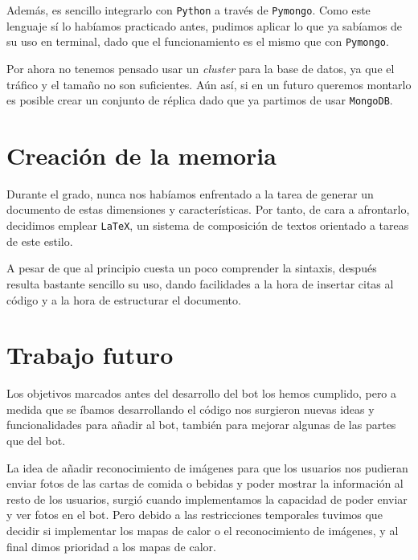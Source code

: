 \documentclass[oneside]{memoir}
\begin{document}
Además, es sencillo integrarlo con \texttt{Python} a través de \texttt{Pymongo}. Como este lenguaje sí lo habíamos practicado antes, pudimos aplicar lo que ya sabíamos de su uso en terminal, dado que el funcionamiento es el mismo que con \texttt{Pymongo}. 

Por ahora no tenemos pensado usar un \textit{cluster} para la base de datos, ya que el tráfico y el tamaño no son suficientes. Aún así, si en un futuro queremos montarlo es posible crear un conjunto de réplica dado que ya partimos de usar \texttt{MongoDB}.


\section{Creación de la memoria}
Durante el grado, nunca nos habíamos enfrentado a la tarea de generar un documento de estas dimensiones y características. Por tanto, de cara a afrontarlo, decidimos emplear \texttt{LaTeX}, un sistema de composición de textos orientado a tareas de este estilo. 

A pesar de que al principio cuesta un poco comprender la sintaxis, después resulta bastante sencillo su uso, dando facilidades a la hora de insertar citas al código y a la hora de estructurar el documento.

\section{Trabajo futuro}
Los objetivos marcados antes del desarrollo del bot los hemos cumplido, pero a medida que se íbamos desarrollando el código nos surgieron nuevas ideas y funcionalidades para añadir al bot, también para mejorar algunas de las partes que del bot.

La idea de añadir reconocimiento de imágenes para que los usuarios nos pudieran enviar fotos de las cartas de comida o bebidas y poder mostrar la información al resto de los usuarios, surgió cuando implementamos la capacidad de poder enviar y ver fotos en el bot. Pero debido a las restricciones temporales tuvimos que decidir si implementar los mapas de calor o el reconocimiento de imágenes, y al final dimos prioridad a los mapas de calor.
\end{document}
